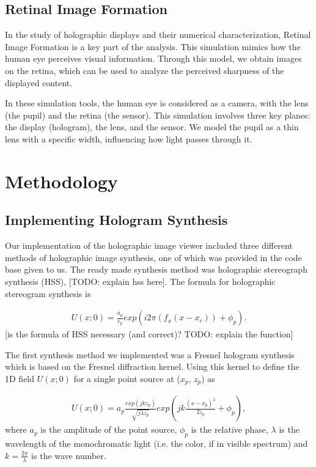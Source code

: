 \documentclass[12pt,a4paper,english
]{tunithesis}
\begin{document}
\section{Retinal Image Formation}
In the study of holographic displays and their numerical characterization, Retinal Image Formation is a key part of the analysis. This simulation mimics how the human eye perceives visual information. Through this model, we obtain images on the retina, which can be used to analyze the perceived sharpness of the displayed content.

In these simulation tools, the human eye is considered as a camera, with the lens (the pupil) and the retina (the sensor). This simulation involves three key planes: the display (hologram), the lens, and the sensor. We model the pupil as a thin lens with a specific width, influencing how light passes through it.



\chapter{Methodology}
\label{sec:methodology}

\section{Implementing Hologram Synthesis}
Our implementation of the holographic image viewer included three different methods of holographic image synthesis, one of which was provided in the code base given to us. The ready made synthesis method was holographic stereograph synthesis (HSS), [TODO: explain hss here]. The formula for holographic stereogram synthesis is 

\begin{align}
  \label{eq:hss}
  U(x;0) = \frac{a_p}{r_p}exp(i 2\pi(f_x(x-x_c))+\phi_p).
\end{align}
[is the formula of HSS necessary (and correct)? TODO: explain the function]


The first synthesis method we implemented was a Fresnel hologram synthesis which is based on the Fresnel diffraction kernel. Using this kernel to define the 1D field $U(x;0)$ for a single point source at  ($x_p$, $z_p$) as

\begin{align}
  \label{eq:fresnel}
  U(x;0) = a_p\frac{exp(j k z_p)}{\sqrt{j \lambda z_p}}exp(jk\frac{(x-x_p)^2}{2z_p}+\phi_p),
\end{align}
where $a_p$ is the amplitude of the point source, $\phi_p$ is the relative phase, $\lambda$ is the wavelength of the monochromatic light (i.e. the color, if in visible spectrum) and $k = \frac{2\pi}{\lambda}$ is the wave number.
\end{document}
